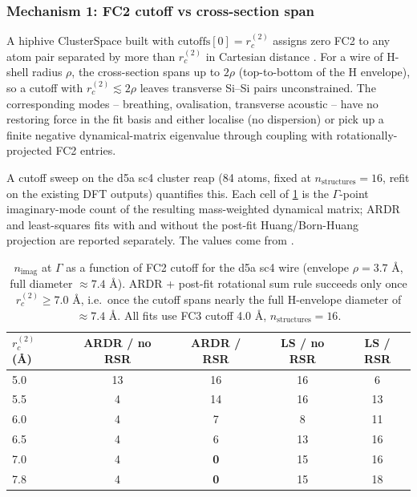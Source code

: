 \subsubsection{Mechanism 1: FC2 cutoff vs cross-section span}
\label{sec:cutoff_vs_section}

A hiphive ClusterSpace built with $\mathrm{cutoffs}[0] = r_c^{(2)}$
assigns zero FC2 to any atom pair separated by more than $r_c^{(2)}$ in
Cartesian distance \cite{eriksson_hiphive_2019}.  For a wire of
H-shell radius $\rho$, the cross-section spans up to $2\rho$
(top-to-bottom of the H envelope), so a cutoff with
$r_c^{(2)} \lesssim 2\rho$ leaves transverse Si--Si pairs unconstrained.
The corresponding modes -- breathing, ovalisation, transverse acoustic
-- have no restoring force in the fit basis and either localise (no
dispersion) or pick up a finite negative dynamical-matrix eigenvalue
through coupling with rotationally-projected FC2 entries.

A cutoff sweep on the d5a sc4 cluster reap (84 atoms, fixed at
$n_\mathrm{structures}=16$, refit on the existing DFT outputs)
quantifies this.  Each cell of \cref{tab:d5a_cutoff_sweep} is the
$\Gamma$-point imaginary-mode count of the resulting
mass-weighted dynamical matrix; ARDR and least-squares fits with and
without the post-fit Huang/Born-Huang projection are reported
separately.  The values come from
.

\begin{table}[ht]
  \centering
  \begin{tabular}{lcccc}
    \toprule
    $r_c^{(2)}$ (Å) & ARDR / no RSR & ARDR / RSR & LS / no RSR & LS / RSR \\
    \midrule
    5.0 & 13 & 16 & 16 &  6 \\
    5.5 &  4 & 14 & 16 & 13 \\
    6.0 &  4 &  7 &  8 & 11 \\
    6.5 &  4 &  6 & 13 & 16 \\
    7.0 &  4 & \textbf{0} & 15 & 16 \\
    7.8 &  4 & \textbf{0} & 15 & 18 \\
    \bottomrule
  \end{tabular}
  \caption{$n_\mathrm{imag}$ at $\Gamma$ as a function of FC2 cutoff for
  the d5a sc4 wire (envelope $\rho = 3.7$ Å, full diameter $\approx 7.4$ Å).
  ARDR + post-fit rotational sum rule succeeds only once
  $r_c^{(2)} \geq 7.0$ Å, i.e.\ once the cutoff spans nearly the full
  H-envelope diameter of $\approx 7.4$ Å.  All fits use FC3 cutoff
  4.0 Å, $n_\mathrm{structures}=16$.}
  \label{tab:d5a_cutoff_sweep}
\end{table}

